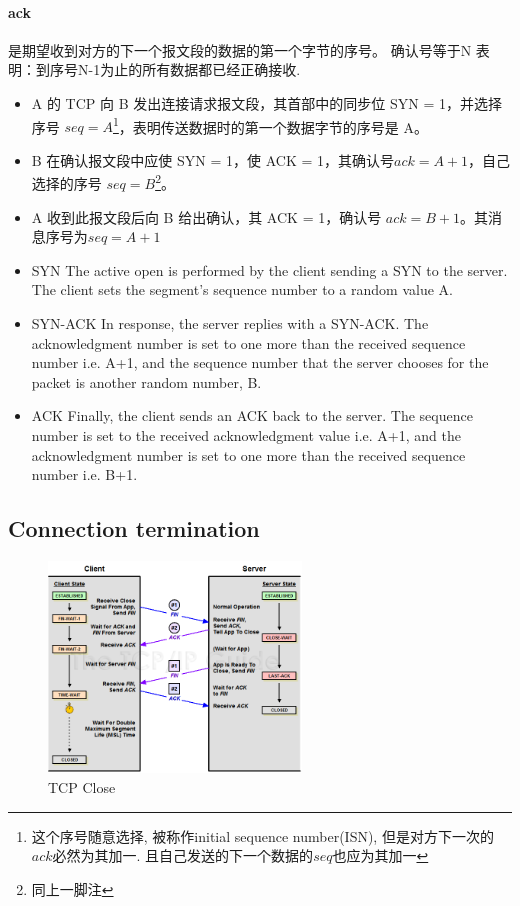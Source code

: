 \documentclass[a4paper]{report}
\begin{document}
\paragraph{ack}是期望收到对方的下一个报文段的数据的第一个字节的序号。 确认号等于N 表明：到序号N-1为止的所有数据都已经正确接收. 
\begin{itemize}
  \item A 的 TCP 向 B 发出连接请求报文段，其首部中的同步位 SYN = 1，并选择序号 $seq = A$\footnote{这个序号随意选择, 被称作initial sequence number(ISN), 但是对方下一次的$ack$必然为其加一. 且自己发送的下一个数据的$seq$也应为其加一}，表明传送数据时的第一个数据字节的序号是 A。
\item B 在确认报文段中应使 SYN = 1，使 ACK = 1，其确认号$ack = A + 1$，自己选择的序号 $seq = B$\footnote{同上一脚注}。
\item A 收到此报文段后向 B 给出确认，其 ACK = 1，确认号 $ack = B + 1$。其消息序号为$seq=A+1$
\end{itemize}
\begin{itemize}
  \item SYN
  \subitem The active open is performed by the client sending a SYN to the server. The client sets the segment's sequence number to a random value A.
  \item SYN-ACK
  \subitem In response, the server replies with a SYN-ACK. The acknowledgment number is set to one more than the received sequence number i.e. A+1, and the sequence number that the server chooses for the packet is another random number, B.
  \item ACK
  \subitem Finally, the client sends an ACK back to the server. The sequence number is set to the received acknowledgment value i.e. A+1, and the acknowledgment number is set to one more than the received sequence number i.e. B+1.
\end{itemize}
\subsection{Connection termination}
\begin{figure}[H]
\centering
\includegraphics[width=0.6\textwidth]{tcpclose.png}
\caption{TCP Close}
\end{figure}
\end{document}
